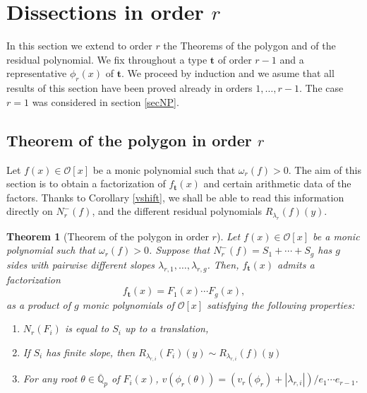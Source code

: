 \documentclass{amsart}
\newtheorem{theorem}{Theorem}[section]
\def\la{\lambda}
\def\om{\omega}
\def\oo{{\mathcal O}}
\def\qpb{\overline{\mathbb{Q}}_p}
\def\t{\theta}
\def\ty{\mathbf{t}}
\def\zpx{\oo[x]}
\begin{document}
\section{Dissections in order $r$}\label{secOre}
In this section we extend to order $r$ the Theorems of the polygon and of the residual polynomial. We fix throughout a type $\ty$ of order $r-1$ and a representative $\phi_r(x)$ of $\ty$. We proceed by induction and we asume that all results of this section have been proved already in orders $1,\dots,r-1$. The case $r=1$ was considered in section \ref{secNP}. 
 
\subsection{Theorem of the polygon in order $r$}
Let $f(x)\in\zpx$ be a monic polynomial such that $\om_r(f)>0$. The aim of this section is to obtain a factori\-zation of $f_{\ty}(x)$ and certain arithmetic data of the factors. Thanks to Corollary \ref{vshift}, we shall be able to read this information directly on $N_r^-(f)$, and the different residual polynomials $R_{\la_r}(f)(y)$.

\begin{theorem}[Theorem of the polygon in order $r$]\label{thpolygonr}
Let $f(x)\in\zpx$ be a monic polynomial such that $\om_r(f)>0$. Suppose that 
$N_r^-(f)=S_1+\cdots+S_g$ has $g$ sides with pairwise different slopes
$\la_{r,1},\dots,\la_{r,g}$. Then, $f_{\ty}(x)$ admits a factorization
$$f_{\ty}(x)=F_1(x)\cdots F_g(x),$$ as a product of $g$ monic polynomials of $\zpx$ satisfying
the following properties:
\begin{enumerate}
\item $N_r(F_i)$ is equal to $S_i$ up to a translation,
\item If $S_i$ has finite slope, then $R_{\la_{r,i}}(F_i)(y)\sim R_{\la_{r,i}}(f)(y)$
\item   For any root $\t\in\qpb$ of $F_i(x)$, $v(\phi_r(\t))=(v_r(\phi_r)+|\la_{r,i}|)/e_1\cdots e_{r-1}$. 
\end{enumerate}
\end{theorem}
\end{document}
